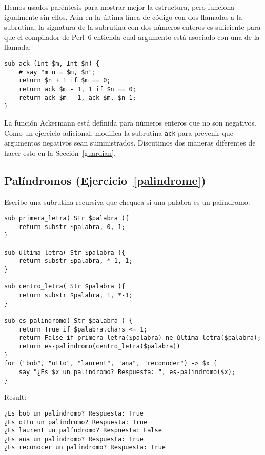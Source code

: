 Hemos usados paréntesis para mostrar mejor la estructura,
pero funciona igualmente sin ellos. Aún en la última línea
de código con dos llamadas a la subrutina, la signatura de la
subrutina con dos números enteros es suficiente para que el
compilador de Perl~6 entienda cual argumento está asociado
con una de la llamada:

\begin{verbatim}
sub ack (Int $m, Int $n) {
    # say "m n = $m, $n";
    return $n + 1 if $m == 0;
    return ack $m - 1, 1 if $n == 0;
    return ack $m - 1, ack $m, $n-1;
}
\end{verbatim}
%

La función Ackermann está definida para números enteros 
que no son negativos. Como un ejercicio adicional, modifica
la subrutina {\tt ack} para prevenir que argumentos negativos 
sean suministrados. Discutimos dos maneras diferentes de hacer
esto en la Sección~\ref{guardian}.


\subsection{Palíndromos (Ejercicio~\ref{palindrome})}
\label{sol_palindrome}

Escribe una subrutina recursiva que chequea si una palabra 
es un palíndromo:

\begin{verbatim}
sub primera_letra( Str $palabra ){
	return substr $palabra, 0, 1;
}

sub última_letra( Str $palabra ){
	return substr $palabra, *-1, 1;
}

sub centro_letra( Str $palabra ){
	return substr $palabra, 1, *-1;
}

sub es-palindromo( Str $palabra ) {
    return True if $palabra.chars <= 1;
    return False if primera_letra($palabra) ne última_letra($palabra);
    return es-palindromo(centro_letra($palabra))
}
for ("bob", "otto", "laurent", "ana", "reconocer") -> $x {
    say "¿Es $x un palíndromo? Respuesta: ", es-palindromo($x);
}
\end{verbatim}

Result:
\begin{verbatim}
¿Es bob un palíndromo? Respuesta: True
¿Es otto un palíndromo? Respuesta: True
¿Es laurent un palíndromo? Respuesta: False
¿Es ana un palíndromo? Respuesta: True
¿Es reconocer un palíndromo? Respuesta: True
\end{verbatim}

